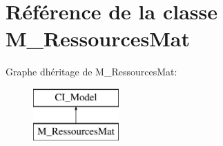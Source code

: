 \hypertarget{class_m___ressources_mat}{}\section{Référence de la classe M\+\_\+\+Ressources\+Mat}
\label{class_m___ressources_mat}
Graphe d\textquotesingle{}héritage de M\+\_\+\+Ressources\+Mat\+:\begin{figure}[H]
\begin{center}
\leavevmode
\includegraphics[height=2.000000cm]{class_m___ressources_mat}
\end{center}
\end{figure}
